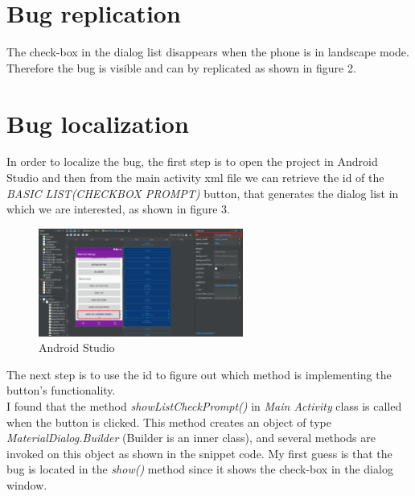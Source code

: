 \documentclass[12pt]{report}
\begin{document}
\section*{Bug replication}
	The check-box in the dialog list disappears when the phone is in landscape mode. Therefore the bug is visible and can by replicated as shown in figure 2.


\section*{Bug localization}
	In order to localize the bug, the first step is to open the project in Android Studio and then from the main activity xml file we can retrieve the id of the \emph{BASIC LIST(CHECKBOX PROMPT)} button, that generates the dialog list in which we are interested, as shown in figure 3.
\begin{figure}[H]
	\centering
	\includegraphics[width=0.6\textwidth]{screenshots/id.png}
	\caption{Android Studio}
\end{figure}
\noindent
	The next step is to use the id to figure out which method is implementing the button's functionality.\\ 
	I found that the method \emph{showListCheckPrompt()} in \emph{Main Activity} class is called when the button is clicked. This method creates an object of type \emph{MaterialDialog.Builder} (Builder is an inner class), and several methods are invoked on this object as shown in the snippet code. My first guess is that the bug is located in the \emph{show()} method since it shows the check-box in the dialog window.
\end{document}
